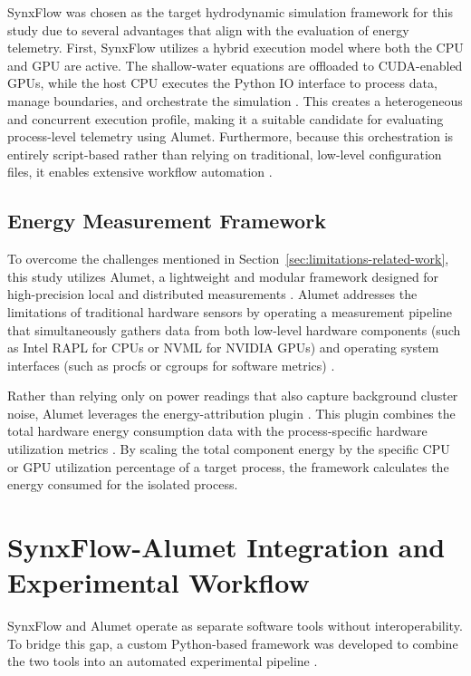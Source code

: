 SynxFlow was chosen as the target hydrodynamic simulation framework for this study due to several advantages that align with the evaluation of energy telemetry. First, SynxFlow utilizes a hybrid execution model where both the CPU and GPU are active. The shallow-water equations are offloaded to CUDA-enabled GPUs, while the host CPU executes the Python IO interface to process data, manage boundaries, and orchestrate the simulation \cite{Xia2025}. This creates a heterogeneous and concurrent execution profile, making it a suitable candidate for evaluating process-level telemetry using Alumet. Furthermore, because this orchestration is entirely script-based rather than relying on traditional, low-level configuration files, it enables extensive workflow automation \cite{Xia2025}.


\subsection{Energy Measurement Framework}
\label{sec:energy-telemetry-framework}

To overcome the challenges mentioned in Section~\ref{sec:limitations-related-work}, this study utilizes Alumet, a lightweight and modular framework designed for high-precision local and distributed measurements \cite{Alumet}. Alumet addresses the limitations of traditional hardware sensors by operating a measurement pipeline that simultaneously gathers data from both low-level hardware components (such as Intel RAPL for CPUs or NVML for NVIDIA GPUs) and operating system interfaces (such as procfs or cgroups for software metrics) \cite{Alumet}.

Rather than relying only on power readings that also capture background cluster noise, Alumet leverages the energy-attribution plugin \cite{Alumet}. This plugin combines the total hardware energy consumption data with the process-specific hardware utilization metrics \cite{Alumet}. By scaling the total component energy by the specific CPU or GPU utilization percentage of a target process, the framework calculates the energy consumed for the isolated process.



\section{SynxFlow-Alumet Integration and Experimental Workflow}
\label{sec:workflow}

SynxFlow and Alumet operate as separate software tools without interoperability. To bridge this gap, a custom Python-based framework was developed to combine the two tools into an automated experimental pipeline \cite{EdguCorrea2026TopographicUQ}.

